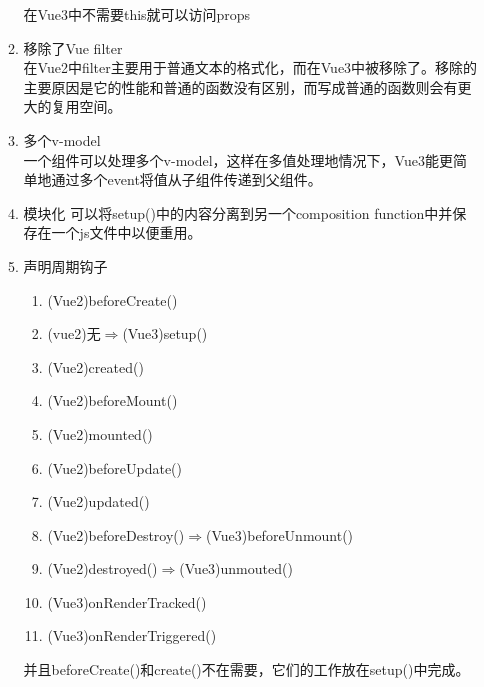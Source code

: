 \begin{enumerate}
\begin{enumerate}
                    在Vue3中不需要this就可以访问props
              \item 移除了Vue filter\\
                    在Vue2中filter主要用于普通文本的格式化，而在Vue3中被移除了。移除的主要原因是它的性能和普通的函数没有区别，而写成普通的函数则会有更大的复用空间。
              \item 多个v-model\\
                    一个组件可以处理多个v-model，这样在多值处理地情况下，Vue3能更简单地通过多个event将值从子组件传递到父组件。
              \item 模块化
                    可以将setup()中的内容分离到另一个composition function中并保存在一个js文件中以便重用。
              \item 声明周期钩子
                    \begin{enumerate}
                        \item (Vue2)beforeCreate()
                        \item (vue2)无$\Rightarrow$(Vue3)setup()
                        \item (Vue2)created()
                        \item (Vue2)beforeMount()
                        \item (Vue2)mounted()
                        \item (Vue2)beforeUpdate()
                        \item (Vue2)updated()
                        \item (Vue2)beforeDestroy()$\Rightarrow$(Vue3)beforeUnmount()
                        \item (Vue2)destroyed()$\Rightarrow$(Vue3)unmouted()
                        \item (Vue3)onRenderTracked()
                        \item (Vue3)onRenderTriggered()
                    \end{enumerate}
                    并且beforeCreate()和create()不在需要，它们的工作放在setup()中完成。
          \end{enumerate}
\end{enumerate}

